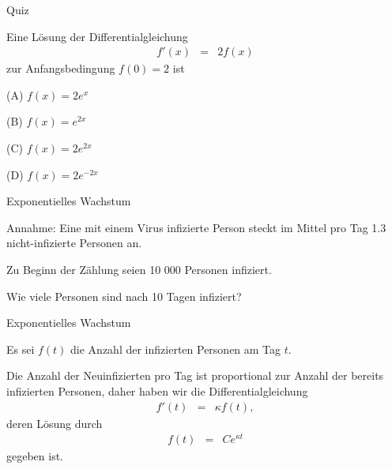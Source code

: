 \documentclass[german]{beamer}
\newcommand{\bq}{\begin{eqnarray*}}
\newcommand{\eq}{\end{eqnarray*}}
\begin{document}
\begin{frame}{Quiz}

Eine L\"osung der Differentialgleichung
\bq
 f'(x) & = & 2 f(x)
\eq
zur Anfangsbedingung $f(0)=2$ ist
\begin{description}
\item{(A)} $f(x) = 2 e^x$
\item{(B)} $f(x) = e^{2x}$
\item{(C)} $f(x) = 2 e^{2x}$
\item{(D)} $f(x) = 2 e^{-2x}$
\end{description}

\end{frame}

\begin{frame}{Exponentielles Wachstum}

\begin{example}
Annahme: Eine mit einem Virus infizierte Person steckt im Mittel pro Tag 1.3 nicht-infizierte Personen an.

Zu Beginn der Z\"ahlung seien 10 000 Personen infiziert.

Wie viele Personen sind nach 10 Tagen infiziert?
\end{example}

\end{frame}

\begin{frame}{Exponentielles Wachstum}

Es sei $f(t)$ die Anzahl der infizierten Personen am Tag $t$.

Die Anzahl der Neuinfizierten pro Tag ist proportional zur Anzahl der bereits infizierten Personen, daher haben
wir die Differentialgleichung
\bq
 f'\left(t\right)
 & = &
 \kappa f\left(t\right),
\eq
deren L\"osung durch
\bq
 f\left(t\right)
 & = & 
 C e^{\kappa t}
\eq
gegeben ist.

\end{frame}
\end{document}
